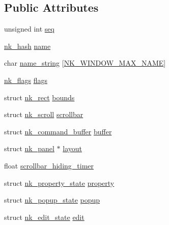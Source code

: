 \subsection*{Public Attributes}
\begin{DoxyCompactItemize}
\item 
unsigned int \mbox{\hyperlink{structnk__window_ac620283e47a5647e437a5f7742ac31bf}{seq}}
\item 
\mbox{\hyperlink{nuklear_8h_a2123e2728db7d1f136b57d6528a0d757}{nk\+\_\+hash}} \mbox{\hyperlink{structnk__window_afdb4b90e7f28cfec870cb349a5161ebc}{name}}
\item 
char \mbox{\hyperlink{structnk__window_a5fbe50f169aa47cab86ebef31e43047a}{name\+\_\+string}} \mbox{[}\mbox{\hyperlink{nuklear_8h_ae8c2d8ba66b02fdd1c64137904c83372}{N\+K\+\_\+\+W\+I\+N\+D\+O\+W\+\_\+\+M\+A\+X\+\_\+\+N\+A\+ME}}\mbox{]}
\item 
\mbox{\hyperlink{nuklear_8h_a19e0e2f6db4862891d9801de3c3da323}{nk\+\_\+flags}} \mbox{\hyperlink{structnk__window_ab2c821a48b401380bc00031d5e7b9e87}{flags}}
\item 
struct \mbox{\hyperlink{structnk__rect}{nk\+\_\+rect}} \mbox{\hyperlink{structnk__window_a3faf3afe7ee63b8203eae8cf28bf1272}{bounds}}
\item 
struct \mbox{\hyperlink{structnk__scroll}{nk\+\_\+scroll}} \mbox{\hyperlink{structnk__window_a6a6e8fdf89a7039df725a14b640dc9df}{scrollbar}}
\item 
struct \mbox{\hyperlink{structnk__command__buffer}{nk\+\_\+command\+\_\+buffer}} \mbox{\hyperlink{structnk__window_ab1a260769cace3a808d1361feeeaa002}{buffer}}
\item 
struct \mbox{\hyperlink{structnk__panel}{nk\+\_\+panel}} $\ast$ \mbox{\hyperlink{structnk__window_ad85f14784c55f21daa8e6bd9d226be43}{layout}}
\item 
float \mbox{\hyperlink{structnk__window_ae1edf68bb62484a80ef588d2ab0fd210}{scrollbar\+\_\+hiding\+\_\+timer}}
\item 
struct \mbox{\hyperlink{structnk__property__state}{nk\+\_\+property\+\_\+state}} \mbox{\hyperlink{structnk__window_ab9fedd0b171796592daf5fa41a08bcea}{property}}
\item 
struct \mbox{\hyperlink{structnk__popup__state}{nk\+\_\+popup\+\_\+state}} \mbox{\hyperlink{structnk__window_aa5a5f13e1d678d56725eab9a0a130acd}{popup}}
\item 
struct \mbox{\hyperlink{structnk__edit__state}{nk\+\_\+edit\+\_\+state}} \mbox{\hyperlink{structnk__window_a5ff816faab95d10bf9bdff4518c268ea}{edit}}

\end{DoxyCompactItemize}
